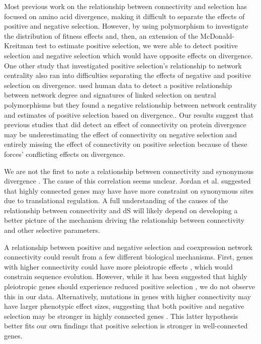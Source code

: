 Most previous work on the relationship between connectivity and selection has focused on amino acid divergence, making it difficult to separate the effects of positive and negative selection. However, by using polymorphism to investigate the distribution of fitness effects and, then, an extension of the McDonald-Kreitman test to estimate positive selection, we were able to detect positive selection and negative selection which would have opposite effects on divergence. One other study that investigated positive selection’s relationship to network centrality also ran into difficulties separating the effects of negative and positive selection on divergence. \citep{Luisi2015-zz} used human data to detect a positive relationship between network degree and signatures of linked selection on neutral polymorphisms but they found a negative relationship between network centrality and estimates of positive selection based on divergence.. Our results suggest that previous studies that did detect an effect of connectivity on protein divergence may be underestimating the effect of connectivity on negative selection and entirely missing the effect of connectivity on positive selection because of these forces’ conflicting effects on divergence.

We are not the first to note a relationship between connectivity and synonymous divergence \citep{Jordan2004-vj}. The cause of this correlation seems unclear. Jordan et al. suggested that highly connected genes may have have more constraint on synonymous sites due to translational regulation. A full understanding of the causes of the relationship between connectivity and dS will likely depend on developing a better picture of the mechanism driving the relationship between connectivity and other selective parameters.

A relationship between positive and negative selection and coexpression network connectivity could result from a few different biological mechanisms. First, genes with higher connectivity could have more pleiotropic effects \citep{he2006}, which would constrain sequence evolution. However, while it has been suggested that highly pleiotropic genes should experience reduced positive selection \citep{orr2000, stern2008}, we do not observe this in our data. Alternatively, mutations in genes with higher connectivity may have larger phenotypic effect sizes, suggesting that both positive and negative selection may be stronger in highly connected genes \citep{Olson-Manning2012-ap}. This latter hypothesis better fits our own findings that positive selection is stronger in well-connected genes.

